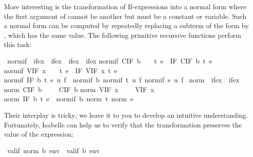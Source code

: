 \begin{isabellebody}
\begin{isamarkuptext}
More interesting is the transformation of If-expressions into a normal form
where the first argument of  cannot be another  but
must be a constant or variable. Such a normal form can be computed by
repeatedly replacing a subterm of the form  by
, which has the same value. The following
primitive recursive functions perform this task:%
\end{isamarkuptext}%
\isamarkuptrue%
\ normif\ {\isacharcolon}{\isacharcolon}\ {\isachardoublequote}ifex\ {\isasymRightarrow}\ ifex\ {\isasymRightarrow}\ ifex\ {\isasymRightarrow}\ ifex{\isachardoublequote}\isanewline
\isamarkupfalse%
\isanewline
{\isachardoublequote}normif\ {\isacharparenleft}CIF\ b{\isacharparenright}\ \ \ \ t\ e\ {\isacharequal}\ IF\ {\isacharparenleft}CIF\ b{\isacharparenright}\ t\ e{\isachardoublequote}\isanewline
{\isachardoublequote}normif\ {\isacharparenleft}VIF\ x{\isacharparenright}\ \ \ \ t\ e\ {\isacharequal}\ IF\ {\isacharparenleft}VIF\ x{\isacharparenright}\ t\ e{\isachardoublequote}\isanewline
{\isachardoublequote}normif\ {\isacharparenleft}IF\ b\ t\ e{\isacharparenright}\ u\ f\ {\isacharequal}\ normif\ b\ {\isacharparenleft}normif\ t\ u\ f{\isacharparenright}\ {\isacharparenleft}normif\ e\ u\ f{\isacharparenright}{\isachardoublequote}\isanewline
\isanewline
\isamarkupfalse%
\ norm\ {\isacharcolon}{\isacharcolon}\ {\isachardoublequote}ifex\ {\isasymRightarrow}\ ifex{\isachardoublequote}\isanewline
\isamarkupfalse%
\isanewline
{\isachardoublequote}norm\ {\isacharparenleft}CIF\ b{\isacharparenright}\ \ \ \ {\isacharequal}\ CIF\ b{\isachardoublequote}\isanewline
{\isachardoublequote}norm\ {\isacharparenleft}VIF\ x{\isacharparenright}\ \ \ \ {\isacharequal}\ VIF\ x{\isachardoublequote}\isanewline
{\isachardoublequote}norm\ {\isacharparenleft}IF\ b\ t\ e{\isacharparenright}\ {\isacharequal}\ normif\ b\ {\isacharparenleft}norm\ t{\isacharparenright}\ {\isacharparenleft}norm\ e{\isacharparenright}{\isachardoublequote}\isamarkupfalse%
%
\begin{isamarkuptext}%
\noindent
Their interplay is tricky; we leave it to you to develop an
intuitive understanding. Fortunately, Isabelle can help us to verify that the
transformation preserves the value of the expression:%
\end{isamarkuptext}%
\isamarkuptrue%
\ {\isachardoublequote}valif\ {\isacharparenleft}norm\ b{\isacharparenright}\ env\ {\isacharequal}\ valif\ b\ env{\isachardoublequote}\isamarkupfalse%

\end{isabellebody}
